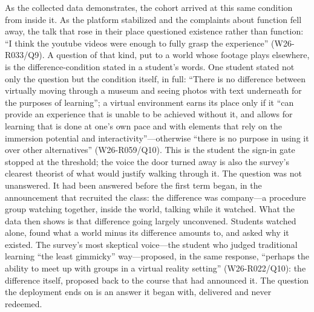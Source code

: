 As the collected data demonstrates, the cohort arrived at this same
condition from inside it. As the platform stabilized and the
complaints about function fell away, the talk that rose in their place
questioned existence rather than function: ``I think the youtube
videos were enough to fully grasp the experience'' (W26-R033/Q9). A
question of that kind, put to a world whose footage plays elsewhere,
is the difference-condition stated in a student's words. One student
stated not only the question but the condition itself, in full: ``There
is no difference between virtually moving through a museum and seeing
photos with text underneath for the purposes of learning''; a virtual
environment earns its place only if it ``can provide an experience that
is unable to be achieved without it, and allows for learning that is done
at one's own pace and with elements that rely on the immersion potential
and interactivity''---otherwise ``there is no purpose in using it over
other alternatives'' (W26-R059/Q10). This is the student the sign-in gate
stopped at the threshold; the voice the door turned away is also the
survey's clearest theorist of what would justify walking through it. The
question was not unanswered. It had been answered before the first term began,
in the announcement that recruited the class: the difference was
company---a procedure group watching together, inside the world,
talking while it watched. What the data then shows is that
difference going largely unconvened. Students watched alone, found
what a world minus its difference amounts to, and asked why it
existed. The survey's most skeptical voice---the student who judged
traditional learning ``the least gimmicky'' way---proposed, in the
same response, ``perhaps the ability to meet up with groups in a
virtual reality setting'' (W26-R022/Q10): the difference itself,
proposed back to the course that had announced it. The question the
deployment ends on is an answer it began with, delivered and never
redeemed.


